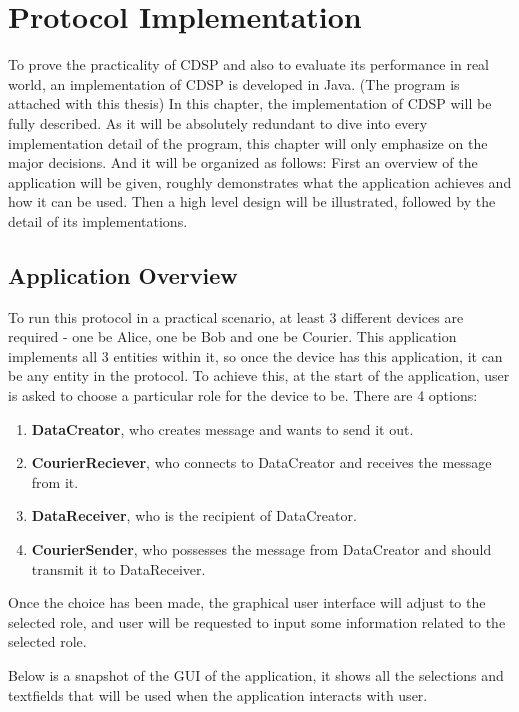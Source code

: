 \chapter{Protocol Implementation}
To prove the practicality of CDSP and also to evaluate its performance in real world, an implementation of CDSP is developed in Java. (The program is attached with this thesis) In this chapter, the implementation of CDSP will be fully described. As it will be absolutely redundant to dive into every implementation detail of the program, this chapter will only emphasize on the major decisions. And it will be organized as follows: First an overview of the application will be given, roughly demonstrates what the application achieves and how it can be used. Then a high level design will be illustrated, followed by the detail of its implementations.

\section{Application Overview}
To run this protocol in a practical scenario, at least 3 different devices are required - one be Alice, one be Bob and one be Courier. This application implements all 3 entities within it, so once the device has this application, it can be any entity in the protocol. To achieve this, at the start of the application, user is asked to choose a particular role for the device to be. There are 4 options:
\begin{enumerate}
\item \textbf{DataCreator}, who creates message and wants to send it out.
\item \textbf{CourierReciever}, who connects to DataCreator and receives the message from it.
\item \textbf{DataReceiver}, who is the recipient of DataCreator.
\item \textbf{CourierSender}, who possesses the message from DataCreator and should transmit it to DataReceiver.
\end{enumerate}
Once the choice has been made, the graphical user interface will adjust to the selected role, and user will be requested to input some information related to the selected role. \par
Below is a snapshot of the GUI of the application, it shows all the selections and textfields that will be used when the application interacts with user.

